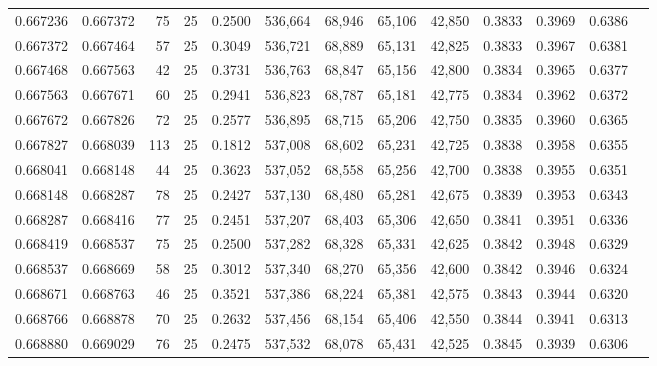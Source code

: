 \begin{tabular}{rrrrrrrrrrrrr}
0.667236 & 0.667372 &    75 &  25 &                                     0.2500 & 536,664 &  68,946 &  65,106 &  42,850 & 0.3833 & 0.3969 & 0.6386 \\
0.667372 & 0.667464 &    57 &  25 &                                     0.3049 & 536,721 &  68,889 &  65,131 &  42,825 & 0.3833 & 0.3967 & 0.6381 \\
0.667468 & 0.667563 &    42 &  25 &                                     0.3731 & 536,763 &  68,847 &  65,156 &  42,800 & 0.3834 & 0.3965 & 0.6377 \\
0.667563 & 0.667671 &    60 &  25 &                                     0.2941 & 536,823 &  68,787 &  65,181 &  42,775 & 0.3834 & 0.3962 & 0.6372 \\
0.667672 & 0.667826 &    72 &  25 &                                     0.2577 & 536,895 &  68,715 &  65,206 &  42,750 & 0.3835 & 0.3960 & 0.6365 \\
0.667827 & 0.668039 &   113 &  25 &                                     0.1812 & 537,008 &  68,602 &  65,231 &  42,725 & 0.3838 & 0.3958 & 0.6355 \\
0.668041 & 0.668148 &    44 &  25 &                                     0.3623 & 537,052 &  68,558 &  65,256 &  42,700 & 0.3838 & 0.3955 & 0.6351 \\
0.668148 & 0.668287 &    78 &  25 &                                     0.2427 & 537,130 &  68,480 &  65,281 &  42,675 & 0.3839 & 0.3953 & 0.6343 \\
0.668287 & 0.668416 &    77 &  25 &                                     0.2451 & 537,207 &  68,403 &  65,306 &  42,650 & 0.3841 & 0.3951 & 0.6336 \\
0.668419 & 0.668537 &    75 &  25 &                                     0.2500 & 537,282 &  68,328 &  65,331 &  42,625 & 0.3842 & 0.3948 & 0.6329 \\
0.668537 & 0.668669 &    58 &  25 &                                     0.3012 & 537,340 &  68,270 &  65,356 &  42,600 & 0.3842 & 0.3946 & 0.6324 \\
0.668671 & 0.668763 &    46 &  25 &                                     0.3521 & 537,386 &  68,224 &  65,381 &  42,575 & 0.3843 & 0.3944 & 0.6320 \\
0.668766 & 0.668878 &    70 &  25 &                                     0.2632 & 537,456 &  68,154 &  65,406 &  42,550 & 0.3844 & 0.3941 & 0.6313 \\
0.668880 & 0.669029 &    76 &  25 &                                     0.2475 & 537,532 &  68,078 &  65,431 &  42,525 & 0.3845 & 0.3939 & 0.6306 \\

\end{tabular}
